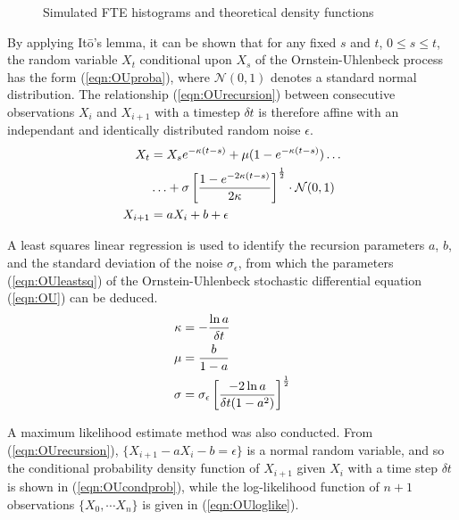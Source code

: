 \documentclass[conference]{IEEEtran}
\begin{document}
\begin{figure}[!h]
\centering
{}
\caption{Simulated FTE histograms and theoretical density functions}
\label{fig:FTEhist}
\end{figure}


By applying It\={o}'s lemma, it can be shown that for any fixed $s$ and $t$, $0\le s\le t$, the random variable $X_t$ conditional upon $X_s$ of the Ornstein-Uhlenbeck process has the form (\ref{eqn:OUproba}), where $\mathcal N(0,1)$ denotes a standard normal distribution. The relationship (\ref{eqn:OUrecursion}) between consecutive observations $X_i$ and $X_{i+1}$ with a timestep $\delta t$ is therefore affine with an independant and identically distributed random noise $\epsilon$.\begin{align}
X_t&=X_s e^{-\kappa (t-s)}+\mu(1-e^{-\kappa (t-s)})\ldots\notag\\
&\ldots +\sigma\left[\frac{1-e^{-2\kappa (t-s)}}{2\kappa}\right]^{\frac{1}{2}}\cdot\mathcal N(0,1)\label{eqn:OUproba}\\
X_{i+1}&=aX_i+b+\epsilon \label{eqn:OUrecursion}
\end{align} 

A least squares linear regression is used to identify the recursion parameters $a$, $b$, and the standard deviation of the noise $\sigma_{\epsilon}$, from which the parameters (\ref{eqn:OUleastsq}) of the Ornstein-Uhlenbeck stochastic differential equation (\ref{eqn:OU}) can be deduced.
\begin{align}
\kappa &=-\frac{\ln a}{\delta t}\notag\\
\mu &=\frac{b}{1-a}\notag\\
\sigma &=\sigma_{\epsilon}\left[\frac{-2\ln a}{\delta t(1-a^2)}\right]^{\frac{1}{2}}\label{eqn:OUleastsq}
\end{align}

A maximum likelihood estimate method was also conducted. From (\ref{eqn:OUrecursion}), $\{X_{i+1}-aX_i-b=\epsilon\}$ is a normal random variable, and so the conditional probability density function of $X_{i+1}$ given $X_i$ with a time step $\delta t$ is shown in (\ref{eqn:OUcondprob}), while the log-likelihood function of $n+1$ observations $\{X_0,\cdots X_n\}$ is given in (\ref{eqn:OUloglike}).
\end{document}
